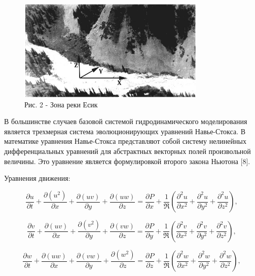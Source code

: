 \begin{figure}[H]
	\centering
	\includegraphics[width=0.8\textwidth]{assets/62}
	\caption*{Рис. 2 - Зона реки Есик}
\end{figure}

\begin{multicols}{2}
В большинстве случаев базовой системой гидродинамического моделирования
является трехмерная система эволюционирующих уравнений Навье-Стокса. В
математике уравнения Навье-Стокса представляют собой систему нелинейных
дифференциальных уравнений для абстрактных векторных полей произвольной
величины. Это уравнение является формулировкой второго закона Ньютона
{[}8{]}.

Уравнения движения:
\end{multicols}

\begin{equation}
\frac{\partial u}{\partial t} + \frac{\partial(u^{2})}{\partial x} + \frac{\partial(uv)}{\partial y} + \frac{\partial(uw)}{\partial z} = \frac{\partial P}{\partial x} + \frac{1}{\Re}\left( \frac{\partial^{2}u}{\partial x^{2}} + \frac{\partial^{2}u}{\partial y^{2}} + \frac{\partial^{2}u}{\partial z^{2}} \right),
\end{equation}

\begin{equation}
\frac{\partial v}{\partial t} + \frac{\partial(uv)}{\partial x} + \frac{\partial(v^{2})}{\partial y} + \frac{\partial(vw)}{\partial z} = \frac{\partial P}{\partial y} + \frac{1}{\Re}\left( \frac{\partial^{2}v}{\partial x^{2}} + \frac{\partial^{2}v}{\partial y^{2}} + \frac{\partial^{2}v}{\partial z^{2}} \right),
\end{equation}

\begin{equation}
\frac{\partial w}{\partial t} + \frac{\partial(uw)}{\partial x} + \frac{\partial(vw)}{\partial y} + \frac{\partial(w^{2})}{\partial z} = \frac{\partial P}{\partial z} + \frac{1}{\Re}\left( \frac{\partial^{2}w}{\partial x^{2}} + \frac{\partial^{2}w}{\partial y^{2}} + \frac{\partial^{2}w}{\partial z^{2}} \right),
\end{equation}

